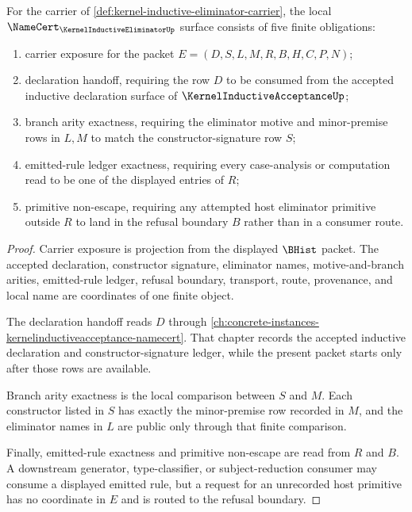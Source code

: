 \begin{theorem}
\label{thm:kernel-inductive-eliminator-namecert-obligations}
For the carrier of \autoref{def:kernel-inductive-eliminator-carrier}, the local $\NameCert_{\KernelInductiveEliminatorUp}$ surface consists of five finite obligations:
\begin{enumerate}
\item carrier exposure for the packet $E=(D,S,L,M,R,B,H,C,P,N)$;
\item declaration handoff, requiring the row $D$ to be consumed from the accepted inductive declaration surface of $\KernelInductiveAcceptanceUp$;
\item branch arity exactness, requiring the eliminator motive and minor-premise rows in $L,M$ to match the constructor-signature row $S$;
\item emitted-rule ledger exactness, requiring every case-analysis or computation read to be one of the displayed entries of $R$;
\item primitive non-escape, requiring any attempted host eliminator primitive outside $R$ to land in the refusal boundary $B$ rather than in a consumer route.
\end{enumerate}
\end{theorem}
\begin{proof}
Carrier exposure is projection from the displayed $\BHist$ packet. The accepted declaration, constructor signature, eliminator names, motive-and-branch arities, emitted-rule ledger, refusal boundary, transport, route, provenance, and local name are coordinates of one finite object.

The declaration handoff reads $D$ through \autoref{ch:concrete-instances-kernelinductiveacceptance-namecert}. That chapter records the accepted inductive declaration and constructor-signature ledger, while the present packet starts only after those rows are available.

Branch arity exactness is the local comparison between $S$ and $M$. Each constructor listed in $S$ has exactly the minor-premise row recorded in $M$, and the eliminator names in $L$ are public only through that finite comparison.

Finally, emitted-rule exactness and primitive non-escape are read from $R$ and $B$. A downstream generator, type-classifier, or subject-reduction consumer may consume a displayed emitted rule, but a request for an unrecorded host primitive has no coordinate in $E$ and is routed to the refusal boundary.
\end{proof}

